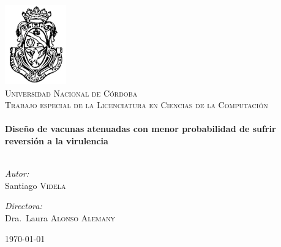 \begin{titlepage}

\begin{center}

\includegraphics[scale=0.5]{famaf}\\[1cm]    

\textsc{\LARGE Universidad Nacional de C\'ordoba}\\[1.5cm]

\textsc{\Large Trabajo especial de la Licenciatura en Ciencias de la
Computaci\'on}\\[0.5cm]


\HRule \\[0.4cm]
{ \huge \bfseries Dise\~no de vacunas atenuadas con menor probabilidad de
sufrir reversi\'on a la virulencia}\\[0.4cm]

\HRule \\[1.5cm]

\begin{minipage}{0.4\textwidth}
\begin{flushleft} \large
\emph{Autor:}\\
Santiago \textsc{Videla}
\end{flushleft}
\end{minipage}
\begin{minipage}{0.4\textwidth}
\begin{flushright} \large
\emph{Directora:} \\
Dra.~Laura \textsc{Alonso Alemany}
\end{flushright}
\end{minipage}

\vfill

{\large \today}

\end{center}

\end{titlepage}
